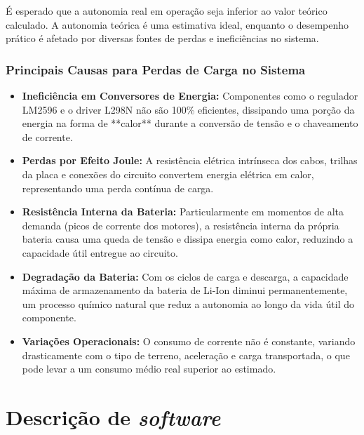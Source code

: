 É esperado que a autonomia real em operação seja inferior ao valor teórico calculado. A autonomia teórica é uma estimativa ideal, enquanto o desempenho prático é afetado por diversas fontes de perdas e ineficiências no sistema.

\subsubsection{Principais Causas para Perdas de Carga no Sistema}

\begin{itemize}
    \item \textbf{Ineficiência em Conversores de Energia:} Componentes como o regulador LM2596 e o driver L298N não são 100\% eficientes, dissipando uma porção da energia na forma de **calor** durante a conversão de tensão e o chaveamento de corrente.
    \item \textbf{Perdas por Efeito Joule:} A resistência elétrica intrínseca dos cabos, trilhas da placa e conexões do circuito convertem energia elétrica em calor, representando uma perda contínua de carga.
    \item \textbf{Resistência Interna da Bateria:} Particularmente em momentos de alta demanda (picos de corrente dos motores), a resistência interna da própria bateria causa uma queda de tensão e dissipa energia como calor, reduzindo a capacidade útil entregue ao circuito.
    \item \textbf{Degradação da Bateria:} Com os ciclos de carga e descarga, a capacidade máxima de armazenamento da bateria de Li-Ion diminui permanentemente, um processo químico natural que reduz a autonomia ao longo da vida útil do componente.
    \item \textbf{Variações Operacionais:} O consumo de corrente não é constante, variando drasticamente com o tipo de terreno, aceleração e carga transportada, o que pode levar a um consumo médio real superior ao estimado.
\end{itemize}

\section{Descrição de \textit{software}}


